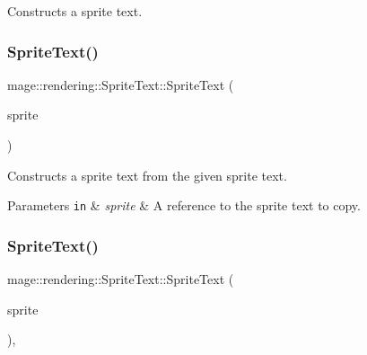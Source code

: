 Constructs a sprite text. \mbox{\label{classmage_1_1rendering_1_1_sprite_text_a60b40732c1a08b88b70335cf91947556}} 
\subsubsection{\texorpdfstring{Sprite\+Text()}{SpriteText()}\hspace{0.1cm}{\footnotesize\ttfamily [2/3]}}
{\footnotesize\ttfamily mage\+::rendering\+::\+Sprite\+Text\+::\+Sprite\+Text (\begin{DoxyParamCaption}\item[{const \mbox{\hyperlink{classmage_1_1rendering_1_1_sprite_text}{Sprite\+Text}} \&}]{sprite }\end{DoxyParamCaption})\hspace{0.3cm}{\ttfamily [default]}}

Constructs a sprite text from the given sprite text.


\begin{DoxyParams}[1]{Parameters}
\mbox{\tt in}  & {\em sprite} & A reference to the sprite text to copy. \\
\hline
\end{DoxyParams}
\mbox{\label{classmage_1_1rendering_1_1_sprite_text_ad2bdddde8371d59c85449a9979017f8c}} 
\subsubsection{\texorpdfstring{Sprite\+Text()}{SpriteText()}\hspace{0.1cm}{\footnotesize\ttfamily [3/3]}}
{\footnotesize\ttfamily mage\+::rendering\+::\+Sprite\+Text\+::\+Sprite\+Text (\begin{DoxyParamCaption}\item[{\mbox{\hyperlink{classmage_1_1rendering_1_1_sprite_text}{Sprite\+Text}} \&\&}]{sprite }\end{DoxyParamCaption})\hspace{0.3cm}{\ttfamily [default]}, {\ttfamily [noexcept]}}

